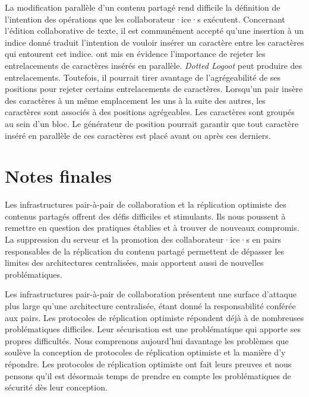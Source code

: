 La modification parallèle d'un contenu partagé rend difficile la définition de l'intention des opérations que les collaborateur·ice·s exécutent.
Concernant l'édition collaborative de texte, il est communément accepté qu'une insertion à un indice donné traduit l'intention de vouloir insérer un caractère entre les caractères qui entourent cet indice.
\textcite{kleppmann2019_interleaving} ont mis en évidence l'importance de rejeter les entrelacements de caractères insérés en parallèle.
\emph{Dotted Logoot} peut produire des entrelacements.
Toutefois, il pourrait tirer avantage de l'agrégeabilité de ses positions pour rejeter certains entrelacements de caractères.
Lorsqu'un pair insère des caractères à un même emplacement les uns à la suite des autres, les caractères sont associés à des positions agrégeables.
Les caractères sont groupés au sein d'un bloc.
Le générateur de position pourrait garantir que tout caractère inséré en parallèle de ces caractères est placé avant ou après ces derniers.


\section{Notes finales}

Les infrastructures pair-à-pair de collaboration et la réplication optimiste des contenus partagés offrent des défis difficiles et stimulants.
Ils nous poussent à remettre en question des pratiques établies et à trouver de nouveaux compromis.
La suppression du serveur et la promotion des collaborateur·ice·s en pairs responsables de la réplication du contenu partagé permettent de dépasser les limites des architectures centralisées, mais apportent aussi de nouvelles problématiques.

Les infrastructures pair-à-pair de collaboration présentent une surface d'attaque plus large qu'une architecture centralisée, étant donné la responsabilité conférée aux pairs.
Les protocoles de réplication optimiste répondent déjà à de nombreuses problématiques difficiles.
Leur sécurisation est une problématique qui apporte ses propres difficultés.
Nous comprenons aujourd'hui davantage les problèmes que soulève la conception de protocoles de réplication optimiste et la manière d'y répondre.
Les protocoles de réplication optimiste ont fait leurs preuves et nous pensons qu'il est désormais temps de prendre en compte les problématiques de sécurité dès leur conception.

